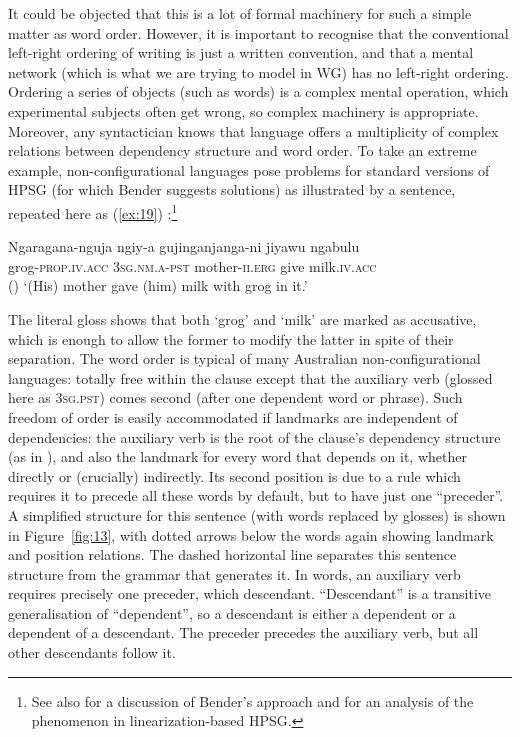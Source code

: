 \documentclass[output=paper
 	        ,biblatex
                ,babelshorthands
                ,newtxmath
                ,draftmode
                ,colorlinks, citecolor=brown
]{langscibook}
\begin{document}
It could be objected that this is a lot of formal machinery for such a simple matter as word order. However, it is important to recognise that the conventional left-right ordering of writing is just a written convention, and that a mental network (which is what we are trying to model in WG) has no left-right ordering. Ordering a series of objects (such as words) is a complex mental operation, which experimental subjects often get wrong, so complex machinery is appropriate.
Moreover, any syntactician knows that language offers a multiplicity of complex relations between
dependency structure and word order. To take an extreme example, non-configurational languages pose
problems for standard versions of HPSG (for which Bender suggests solutions) as illustrated by a
 sentence, repeated here as (\ref{ex:19}) \parencites[]{Bender2008a}{Nordlinger1998}:\footnote{
  See also  for a discussion of
    Bender's approach and  for an analysis
    of the phenomenon in linearization-based HPSG.
}

\begin{exe}
\ex \label{ex:19}
\gll Ngaragana-nguja ngiy-a gujinganjanga-ni jiyawu ngabulu\\
     grog\textsc{-prop}.\textsc{iv}.\textsc{acc} 3\textsc{sg}.\textsc{nm}.\textsc{a}-\textsc{pst} mother-\textsc{ii}.\textsc{erg} give milk.\textsc{iv}.\textsc{acc}\\\hfill()
\glt `(His) mother gave (him) milk with grog in it.'
\end{exe}

\noindent
The literal gloss shows that both `grog' and `milk' are marked as accusative, which is enough to allow the former to modify the latter in spite of their separation. The word order is typical of many Australian non-configurational languages: totally free within the clause except that the auxiliary verb (glossed here as \textsc{3sg.pst}) comes second (after one dependent word or phrase). Such freedom of order is easily accommodated if landmarks are independent of dependencies: the auxiliary verb is the root of the clause's dependency structure (as in ), and also the landmark for every word that depends on it, whether directly or (crucially) indirectly. Its second position is due to a rule which requires it to precede all these words by default, but to have just one ``preceder''. A simplified structure for this sentence (with  words replaced by  glosses) is shown in Figure~\ref{fig:13}, with dotted arrows below the words again showing landmark and position relations. The dashed horizontal line separates this sentence structure from the grammar that generates it. In words, an auxiliary verb requires precisely one preceder, which  descendant. ``Descendant'' is a transitive generalisation of ``dependent'', so a descendant is either a dependent or a dependent of a descendant. The preceder precedes the auxiliary verb, but all other descendants follow it.
\end{document}
